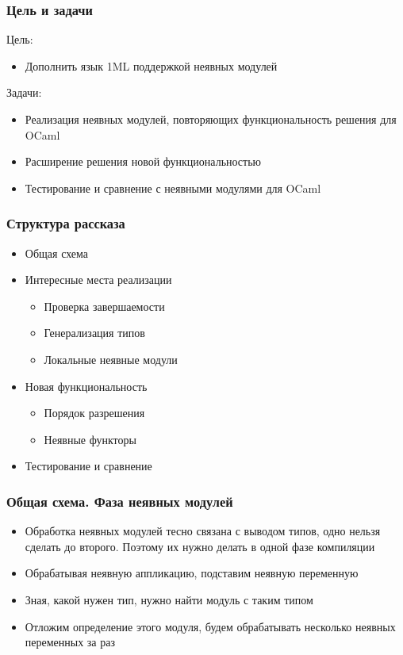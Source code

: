 \documentclass{beamer}
\begin{document}
\begin{frame}\frametitle{Цель и задачи}
Цель:
\begin{itemize}
  \item Дополнить язык 1ML поддержкой неявных модулей
\end{itemize}
Задачи:
\begin{itemize}
  \item Реализация неявных модулей, повторяющих функциональность решения для OCaml
  \item Расширение решения новой функциональностью
  \item Тестирование и сравнение с неявными модулями для OCaml
\end{itemize}
\end{frame}

\begin{frame}\frametitle{Структура рассказа}
\begin{itemize}
  \item Общая схема
  \item Интересные места реализации
  \begin{itemize}
    \item Проверка завершаемости
    \item Генерализация типов
    \item Локальные неявные модули
  \end{itemize}
  \item Новая функциональность
  \begin{itemize}
    \item Порядок разрешения
    \item Неявные функторы
  \end{itemize}
  \item Тестирование и сравнение
\end{itemize}
\end{frame}

\begin{frame}\frametitle{Общая схема. Фаза неявных модулей}
\begin{itemize}
  \item Обработка неявных модулей тесно связана с выводом типов, одно нельзя сделать до второго. Поэтому их нужно делать в одной фазе компиляции
  \item Обрабатывая неявную аппликацию, подставим неявную переменную
  \item Зная, какой нужен тип, нужно найти модуль с таким типом
  \item Отложим определение этого модуля, будем обрабатывать несколько неявных переменных за раз
\end{itemize}
\end{frame}
\end{document}
